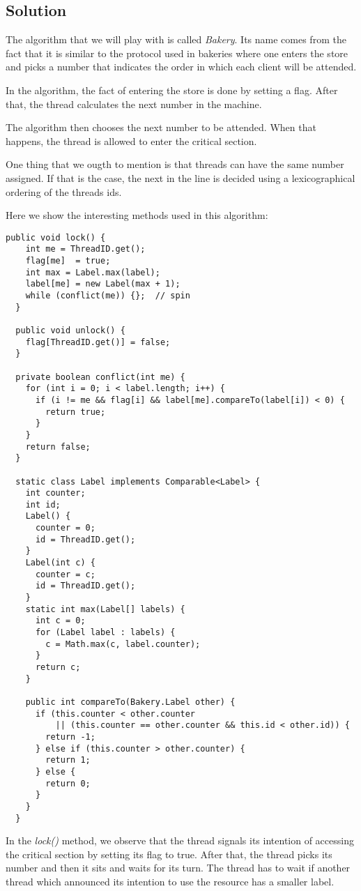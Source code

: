 \subsection{Solution}
\par
The algorithm that we will play with is called \textit{Bakery}. Its name comes from the
fact that it is similar to the protocol used in bakeries where one enters the
store and picks a number that indicates the order in which each client will be
attended. 
\par
In the algorithm, the fact of entering the store is done by setting a flag.
After that, the thread calculates the next number in the machine. 
\par
The algorithm then chooses the next number to be attended. When that happens,
the thread is allowed to enter the critical section.
\par
One thing that we ougth to mention is that threads can have the same number
assigned. If that is the case, the next in the line is decided using a
lexicographical ordering of the threads ids.
\par
Here we show the interesting methods used in this algorithm:
\par
\hfill
\begin{lstlisting}[style=numbers]
  public void lock() {
    int me = ThreadID.get();
    flag[me]  = true;
    int max = Label.max(label);
    label[me] = new Label(max + 1);
    while (conflict(me)) {};  // spin
  }

  public void unlock() {
    flag[ThreadID.get()] = false;
  }
  
  private boolean conflict(int me) {
    for (int i = 0; i < label.length; i++) {
      if (i != me && flag[i] && label[me].compareTo(label[i]) < 0) {
        return true;
      }
    }
    return false;
  }

  static class Label implements Comparable<Label> {
    int counter;
    int id;
    Label() {
      counter = 0;
      id = ThreadID.get();
    }
    Label(int c) {
      counter = c;
      id = ThreadID.get();
    }
    static int max(Label[] labels) {
      int c = 0;
      for (Label label : labels) {
        c = Math.max(c, label.counter);
      }
      return c;
    }
    
    public int compareTo(Bakery.Label other) {
      if (this.counter < other.counter
          || (this.counter == other.counter && this.id < other.id)) {
        return -1;
      } else if (this.counter > other.counter) {
        return 1;
      } else {
        return 0;
      }
    }
  }
\end{lstlisting}
\hfill
\par
In the \textit{lock()} method, we observe that the thread signals its intention
of accessing the critical section by setting its flag to true. After that, the
thread picks its number and then it sits and waits for its turn. The thread has
to wait if another thread which announced its intention to use the resource has
a smaller label. 
\par
